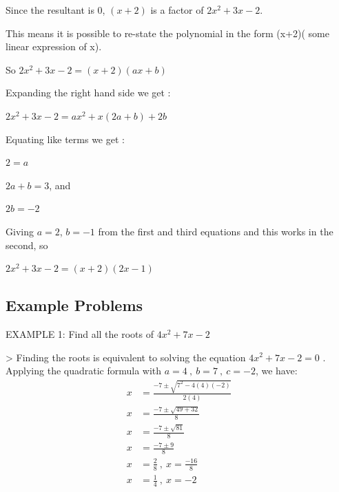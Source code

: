 Since the resultant is 0, $(x+2)$ is a factor of $2x^2 + 3x -2$.



This means it is possible to re-state the polynomial in the form (x+2)( some linear
expression of x).



So $2x^2 + 3x -2 = (x+2)(ax+b)$



Expanding the right hand side we get :



$2x^2 + 3x -2 = ax^2 + x( 2a+b) +2b$



Equating like terms we get :



$2= a$



$2a+b = 3$, and



$2b = -2$



Giving $a = 2$, $b= -1$ from the first and third equations and this works in the second, so



$2x^2 + 3x -2 = (x+2)(2x-1)$




\subsection{Example Problems}
\label{sss:exam-b742}




EXAMPLE 1: Find all the roots of $4x^2+7x-2$



> Finding the roots is equivalent to solving the equation $4x^2+7x-2=0$ . Applying the
quadratic formula with $a=4\ ,\ b=7\ ,\ c=-2$, we have:
\begin{align}x &= \frac{-7\pm\sqrt{7^2-4(4)(-2)}}{2(4)} \\
    x &= \frac{-7\pm\sqrt{49 + 32}}{8} \\
    x &= \frac{-7\pm\sqrt{81}}{8} \\
    x &= \frac{-7\pm 9}{8} \\
    x &= \frac{2}{8}\ ,\ x = \frac{-16}{8} \\
    x &= \frac{1}{4}\ ,\ x = -2 
\end{align}





